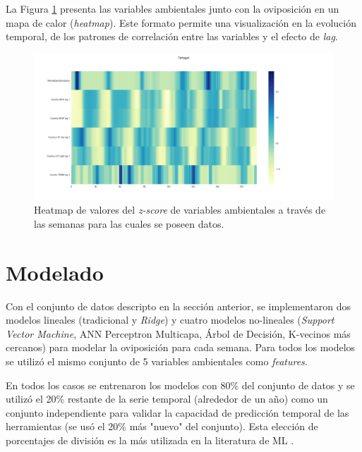   \par La Figura \ref{fig:heatmap} presenta las variables ambientales junto
    con la oviposición en un mapa de calor (\textit{heatmap}). Este formato
    permite una visualización en la evolución temporal, de los
    patrones de correlación entre las variables y el efecto de \textit{lag}.

    \begin{figure}[hbt]
    \centering%
    \includegraphics[width=1\textwidth]{images/heatmap}%
    \caption{Heatmap de valores del \textit{z-score} de variables ambientales a través de las semanas
            para las cuales se poseen datos.}\label{fig:heatmap}
    \end{figure}



\section{Modelado}

  \par Con el conjunto de datos descripto en la sección anterior, se implementaron
    dos modelos lineales (tradicional y \textit{Ridge}) y cuatro modelos
    no-lineales (\textit{Support Vector Machine}, ANN Perceptron Multicapa,
    Árbol de Decisión, K-vecinos más cercanos) para modelar la oviposición
    para cada semana. Para todos los modelos se utilizó el mismo conjunto de
    5 variables ambientales como \textit{features}.

  \par En todos los casos se entrenaron los modelos con 80\% del conjunto de
    datos y se utilizó el 20\% restante de la serie temporal (alrededor de un año)
    como un conjunto independiente para validar la capacidad de predicción temporal
    de las herramientas (se usó el 20\% más "nuevo" del conjunto). Esta elección
    de porcentajes de división es la más utilizada en la literatura de ML \cite{ml_rainfall}.

